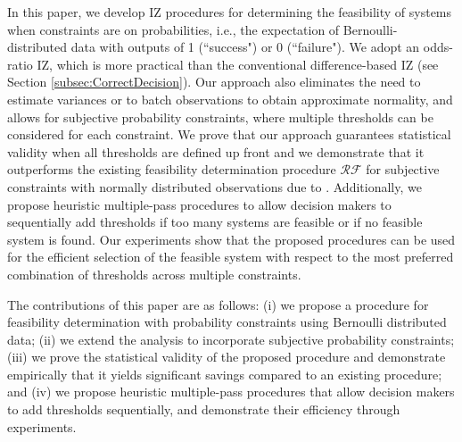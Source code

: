 \documentclass[11pt]{article}
\begin{document}
In this paper, we develop IZ procedures for determining the feasibility of systems when constraints are on probabilities, i.e., the expectation of Bernoulli-distributed data with outputs of 1 (``success") or 0 (``failure"). We adopt an odds-ratio IZ, which is more practical than the conventional difference-based IZ (see Section \ref{subsec:CorrectDecision}). Our approach also eliminates the need to estimate variances or to batch observations to obtain approximate normality, and allows for subjective probability constraints, where multiple thresholds can be considered for each constraint. We prove that our approach guarantees statistical validity when all thresholds are defined up front and we demonstrate that it outperforms the existing feasibility determination procedure $\mathcal{RF}$ for subjective constraints with normally distributed observations due to \cite{zhou2022finding}.
Additionally, we propose heuristic multiple-pass procedures to allow decision makers to sequentially add thresholds if too many systems are feasible or if no feasible system is found. Our experiments show that the proposed procedures can be used for the efficient selection of the feasible system with respect to the most preferred combination of thresholds across multiple constraints.

The contributions of this paper are as follows: (i) we propose a procedure for feasibility determination with probability constraints using Bernoulli distributed data; (ii) we extend the analysis to incorporate subjective probability constraints; (iii) we prove the statistical validity of the proposed procedure and demonstrate empirically that it yields significant savings compared to an existing procedure; and (iv) we propose heuristic multiple-pass procedures that allow decision makers to add thresholds sequentially, and demonstrate their efficiency through experiments. 
\end{document}
